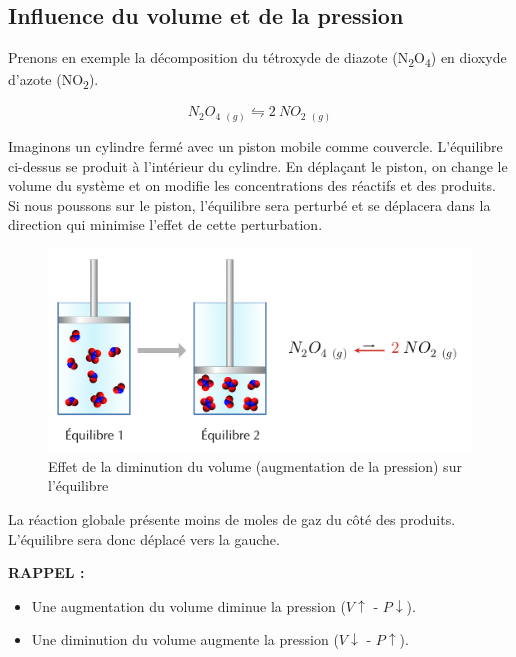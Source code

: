 \documentclass[
  11pt,
  french,
  a4paper,
  openany]{book}
\providecommand{\tightlist}{%
  \setlength{\itemsep}{0pt}\setlength{\parskip}{0pt}}
\begin{document}
\hypertarget{influence-du-volume-et-de-la-pression}{%
\subsection{Influence du volume et de la pression}\label{influence-du-volume-et-de-la-pression}}

Prenons en exemple la décomposition du tétroxyde de diazote (N\textsubscript{2}O\textsubscript{4}) en dioxyde d'azote (NO\textsubscript{2}).

\[
  N_2O_4\ {}_{(g)} \leftrightharpoons 2\ NO_2\ {}_{(g)}
\]

Imaginons un cylindre fermé avec un piston mobile comme couvercle. L'équilibre ci-dessus se produit à l'intérieur du cylindre. En déplaçant le piston, on change le volume du système et on modifie les concentrations des réactifs et des produits. Si nous poussons sur le piston, l'équilibre sera perturbé et se déplacera dans la direction qui minimise l'effet de cette perturbation.

\clearpage

\begin{figure}

{\centering \includegraphics[width=0.75\linewidth]{images/equilibres-pressions-1} 

}

\caption{Effet de la diminution du volume (augmentation de la pression) sur l'équilibre}\label{fig:equilibres-pressions-1}
\end{figure}

La réaction globale présente moins de moles de gaz du côté des produits. L'équilibre sera donc déplacé vers la gauche.

\textbf{RAPPEL :}

\begin{itemize}
\tightlist
\item
  Une augmentation du volume diminue la pression (\(V \uparrow\) - \(P \downarrow\)).
\item
  Une diminution du volume augmente la pression (\(V \downarrow\) - \(P \uparrow\)).
\end{itemize}
\end{document}
